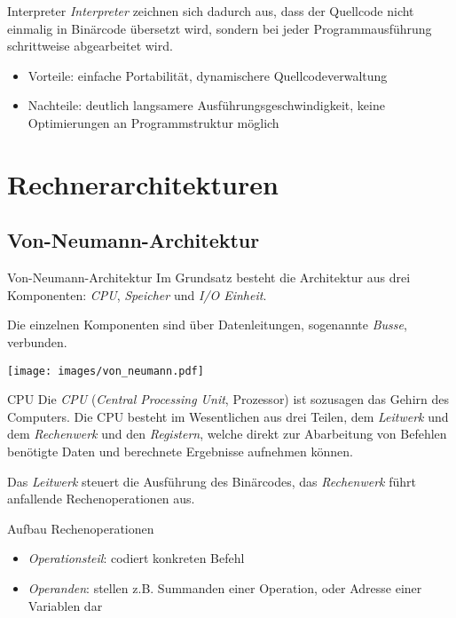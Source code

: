 \documentclass[german]{../spicker}
\begin{document}
\begin{defi}{Interpreter}
    \emph{Interpreter} zeichnen sich dadurch aus, dass der Quellcode nicht einmalig in Binärcode übersetzt wird, sondern bei jeder Programmausführung schrittweise abgearbeitet wird.
    \begin{itemize}
        \item Vorteile: einfache Portabilität, dynamischere Quellcodeverwaltung
        \item Nachteile: deutlich langsamere Ausführungsgeschwindigkeit, keine Optimierungen an Programmstruktur möglich
    \end{itemize}
\end{defi}

\section{Rechnerarchitekturen}
\subsection{Von-Neumann-Architektur}

\begin{defi}{Von-Neumann-Architektur}
    Im Grundsatz besteht die Architektur aus drei Komponenten: \emph{CPU}, \emph{Speicher} und \emph{I/O Einheit}.

    Die einzelnen Komponenten sind über Datenleitungen, sogenannte \emph{Busse}, verbunden.
    \begin{center}
        \texttt{[image: images/von\_neumann.pdf]}
    \end{center}
\end{defi}

\begin{defi}{CPU}
    Die \emph{CPU} (\emph{Central Processing Unit}, Prozessor) ist sozusagen das Gehirn des Computers.
    Die CPU besteht im Wesentlichen aus drei Teilen, dem \emph{Leitwerk} und
    dem \emph{Rechenwerk} und den \emph{Registern}, welche direkt zur Abarbeitung von Befehlen
    benötigte Daten und berechnete Ergebnisse aufnehmen können.

    Das \emph{Leitwerk} steuert die Ausführung des Binärcodes, das \emph{Rechenwerk} führt anfallende Rechenoperationen aus.
\end{defi}

\begin{bonus}{Aufbau Rechenoperationen}
    \begin{itemize}
        \item \emph{Operationsteil}: codiert konkreten Befehl
        \item \emph{Operanden}: stellen z.B. Summanden einer Operation, oder Adresse einer Variablen dar
    \end{itemize}
\end{bonus}
\end{document}
